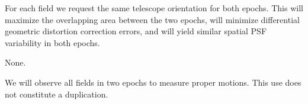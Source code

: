 \documentclass[12pt]{article}
\begin{document}
For each field we request the same telescope orientation for both epochs.
This will maximize the overlapping area between the two epochs, will minimize differential geometric distortion correction errors, and will yield similar spatial PSF variability in both epochs.


%
%
\coordinatedobs          %
None.


%
%
\duplications           %
We will observe all fields in two epochs to measure proper motions.
This use does not constitute a duplication.


\end{document}

